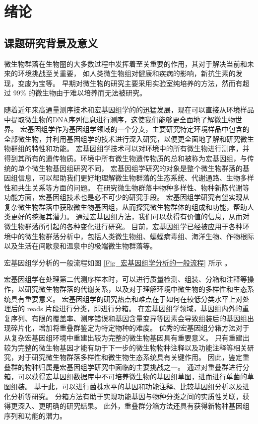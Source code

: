 \chapter{绪论}
\section{课题研究背景及意义}
微生物群落在生物圈的大多数过程中发挥着至关重要的作用，其对于解决当前和未来的环境挑战至关重要，
如人类微生物组对健康和疾病的影响，新抗生素的发现，变废为宝等。
早期对微生物的研究主要采用实验室纯培养的方法，然而有超过 99\% 的微生物由于难以培养而无法被研究。

随着近年来高通量测序技术和宏基因组学的的迅猛发展，现在可以直接从环境样品中提取微生物的DNA序列信息进行测序，这使我们能够更全面地了解微生物世界。
宏基因组学作为基因组学领域的一个分支，主要研究特定环境样品中包含的全部微生物，并利用基因组学的技术进行深入研究，以便更全面地了解和研究微生物群组的特性和功能。
宏基因组学技术可以对环境中的所有微生物进行测序，并得到其所有的遗传物质。环境中所有微生物遗传物质的总和被称为宏基因组，与传统的单个微生物基因组研究不同，
宏基因组学研究的对象是整个微生物群落的基因组信息，可以帮助我们更好地理解微生物群落的生态系统、代谢通路、生物多样性和共生关系等方面的问题。
在研究微生物群落中物种多样性、物种新陈代谢等功能方面，宏基因组技术也是必不可少的研究手段。
宏基因组学研究有望实现从复杂微生物群落中获取微生物基因组，从而探究微生物群体的组成和功能，帮助人类更好的挖掘其潜力。
通过宏基因组方法，我们可以获得有价值的信息，从而对微生物群落所引起的各种变化进行研究。
目前，宏基因组学已经被应用于各种环境中的微生物群落分析中，包括人类微生物组、蝙蝠病毒组、海洋生物、作物根际以及生活在间歇泉和温泉中的极端微生物群落等。

宏基因组学分析的一般流程如图 \ref{Fig_宏基因组学分析的一般流程} 所示 \cite{宏基因组重叠群分箱方法研究综述}。


宏基因组学在处理第二代测序样本时，可以进行质量检测、组装、分箱和注释等操作，以研究微生物群落的代谢关系，以及对于理解环境中微生物的多样性和生态系统具有重要意义。
宏基因组学的研究热点和难点在于如何在较低分类水平上对处理后的 reads 片段进行分类，即进行分箱。
在宏基因组学领域，基因组内外的重复序列、有限的覆盖率、测序错误和基因含量变异等因素会导致组装后的基因组出现碎片化，增加将重叠群鉴定为特定物种的难度。
优秀的宏基因组分箱方法对于从复杂宏基因组环境中重建出较为完整的微生物基因具有重要意义。
只有重建出较为完整的微生物基因才能有助于下一步的微生物物种注释以及功能注释等相关研究，对于研究微生物群落多样性和微生物生态系统具有关键作用。
因此，鉴定重叠群的物种归属是宏基因组学研究中面临的主要挑战之一。
通过对重叠群进行分箱，可以获得宏基因组数据库中不可培养微生物的基因组草图，进而进行单菌的草图组装。
基于此，可以进行菌株水平的基因和功能注释、比较基因组分析以及进化分析等研究。
分箱方法有助于实现功能基因与物种分类之间的实质性关联，获得更深入、更明确的研究结果。
此外，重叠群分箱方法还具有获得新物种基因组序列和功能的潜力。

